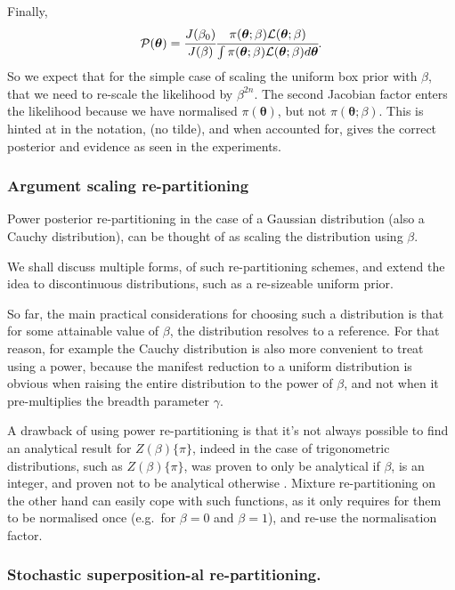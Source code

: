 \documentclass[usenatbib]{mnras}
\begin{document}
Finally, 
\begin{equation*}
 {\cal P}(\bm{\theta}) = \cfrac{J(\beta_{0})}{J(\beta)} \cfrac{\pi(\bm{\theta}; \beta) {\cal L}(\bm{\theta}; \beta)}{\int \pi(\bm{\theta}; \beta) {\cal L}(\bm{\theta}; \beta) d \bm{\theta}}.
\end{equation*}
So we expect that for the simple case of scaling the uniform box
prior with \(\beta\), that we need to re-scale the likelihood by
\(\beta^{2n}\). The second Jacobian factor enters the likelihood because
we have normalised \(\pi(\bm{\theta})\), but not \(\pi(\bm{\theta}; \beta)\). This is hinted at in
the notation, (no tilde), and when accounted for, gives  the correct
posterior and evidence as seen in the experiments. 


\subsubsection{Argument scaling re-partitioning}\label{sec:orgfe92f25}

Power posterior re-partitioning in the case of a Gaussian
distribution (also a Cauchy distribution), can be thought of as
scaling the distribution using \(\beta\).

We shall discuss multiple forms, of such re-partitioning schemes,
and extend the idea to discontinuous distributions, such as a
re-sizeable uniform prior.  

So far, the main practical considerations for choosing such a
distribution is that for some attainable value of \(\beta\), the
distribution resolves to a reference. For that reason, for example
the Cauchy distribution is also more convenient to treat using a
power, because the manifest reduction to a uniform distribution is
obvious when raising the entire distribution to the power of
\(\beta\), and not when it pre-multiplies the breadth parameter
\(\gamma\).

A drawback of using power re-partitioning is that it's not always
possible to find an analytical result for \(Z(\beta)\{\pi\}\), indeed
in the case of trigonometric distributions, such as \(Z(\beta)\{\pi\}\),
was proven to only be analytical if \(\beta\), is an integer, and
proven not to be analytical otherwise \citep{Liouville1837}. Mixture
re-partitioning on the other hand can easily cope with such
functions, as it only requires for them to be normalised once
(e.g.~for \(\beta=0\) and \(\beta=1\)), and re-use the normalisation
factor.


\subsubsection{Stochastic superposition-al re-partitioning.}\label{sec:org0385763}
\end{document}
